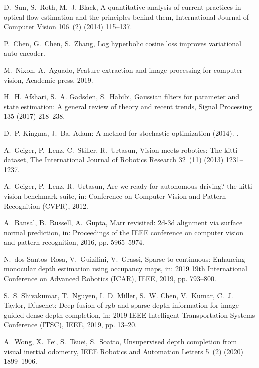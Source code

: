 \documentclass[5p]{elsarticle}
\begin{document}
\begin{thebibliography}{100}
D.~Sun, S.~Roth, M.~J. Black, A quantitative analysis of current practices in
  optical flow estimation and the principles behind them, International Journal
  of Computer Vision 106~(2) (2014) 115--137.

P.~Chen, G.~Chen, S.~Zhang, Log hyperbolic cosine loss improves variational
  auto-encoder.

M.~Nixon, A.~Aguado, Feature extraction and image processing for computer
  vision, Academic press, 2019.

H.~H. Afshari, S.~A. Gadsden, S.~Habibi, Gaussian filters for parameter and
  state estimation: A general review of theory and recent trends, Signal
  Processing 135 (2017) 218--238.

D.~P. Kingma, J.~Ba, Adam: A method for stochastic optimization (2014).
\newblock \href {http://arxiv.org/abs/1412.6980} {}.

A.~Geiger, P.~Lenz, C.~Stiller, R.~Urtasun, Vision meets robotics: The kitti
  dataset, The International Journal of Robotics Research 32~(11) (2013)
  1231--1237.

A.~Geiger, P.~Lenz, R.~Urtasun, Are we ready for autonomous driving? the kitti
  vision benchmark suite, in: Conference on Computer Vision and Pattern
  Recognition (CVPR), 2012.

A.~Bansal, B.~Russell, A.~Gupta, Marr revisited: 2d-3d alignment via surface
  normal prediction, in: Proceedings of the IEEE conference on computer vision
  and pattern recognition, 2016, pp. 5965--5974.

N.~dos Santos~Rosa, V.~Guizilini, V.~Grassi, Sparse-to-continuous: Enhancing
  monocular depth estimation using occupancy maps, in: 2019 19th International
  Conference on Advanced Robotics (ICAR), IEEE, 2019, pp. 793--800.

S.~S. Shivakumar, T.~Nguyen, I.~D. Miller, S.~W. Chen, V.~Kumar, C.~J. Taylor,
  Dfusenet: Deep fusion of rgb and sparse depth information for image guided
  dense depth completion, in: 2019 IEEE Intelligent Transportation Systems
  Conference (ITSC), IEEE, 2019, pp. 13--20.

A.~Wong, X.~Fei, S.~Tsuei, S.~Soatto, Unsupervised depth completion from visual
  inertial odometry, IEEE Robotics and Automation Letters 5~(2) (2020)
  1899--1906.


\end{thebibliography}
\end{document}
